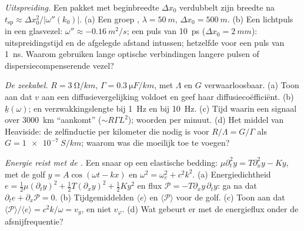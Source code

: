 \begin{exercise}[$\star\star$]\label{exo:b2:dispersion-wave-packets:8}
\emph{Uitspreiding.} Een pakket met beginbreedte $\Delta x_0$ verdubbelt
zijn breedte na $t_{\text{sp}} \approx \Delta x_0^2/|\omega''(k_0)|$. (a)
Een groep , $\lambda = \qty{50}{m}$,
$\Delta x_0 = \qty{500}{m}$. (b) Een lichtpuls in een glasvezel:
$\omega'' \approx \qty{-0.16}{m^2/s}$; een puls van \qty{10}{ps}
($\Delta x_0 =
\qty{2}{mm}$): uitspreidingstijd en de afgelegde afstand
intussen; hetzelfde voor een puls van \qty{1}{ns}. Waarom gebruiken lange
optische verbindingen langere pulsen of dispersiecompenserende vezel?
\end{exercise}

\begin{exercise}[$\star\star$]\label{exo:b2:dispersion-wave-packets:9}
\emph{De zeekabel.} $R = \qty{3}{\ohm/km}$,
$\Gamma = \qty{0.3}{\micro F/km}$, met $\Lambda$ en $G$ verwaarloosbaar. (a)
Toon aan dat $v$ aan een diffusievergelijking voldoet en geef haar
diffusiecoëfficiënt. (b)  $\underline k(\omega)$;
 en verzwakkingslengte bij \qty{1}{Hz} en bij \qty{10}{Hz}. (c)
Tijd waarin een signaal over \qty{3000}{km} ``aankomt''
($\sim R\Gamma L^2$); woorden per minuut. (d) Het middel van Heaviside: de
zelfinductie per kilometer die nodig is voor $R/\Lambda = G/\Gamma$ als
$G = \qty{1e-7}{S/km}$; waarom was die moeilijk toe te voegen?
\end{exercise}

\begin{exercise}[$\star\star\star$]\label{exo:b2:dispersion-wave-packets:10}
\emph{Energie reist met de .} Een snaar op een elastische
bedding: $\mu\partial_t^2y = T\partial_x^2y - Ky$, met de golf
$y = A\cos(\omega t - kx)$ en $\omega^2 =
\omega_c^2 + c^2k^2$. (a)
Energiedichtheid
$e = \tfrac12\mu(\partial_ty)^2 + \tfrac12T
(\partial_xy)^2 + \tfrac12Ky^2$
en flux $\mathcal P = -T\partial_xy\,\partial_ty$: ga na dat
$\partial_te + \partial_x\mathcal P = 0$. (b) Tijdgemiddelden
$\langle e\rangle$ en $\langle\mathcal P\rangle$ voor de golf. (c) Toon aan
dat $\langle\mathcal P\rangle/
\langle e\rangle = c^2k/\omega = v_g$, en
niet $v_\varphi$. (d) Wat gebeurt er met de energieflux onder de
afsnijfrequentie?
\end{exercise}

